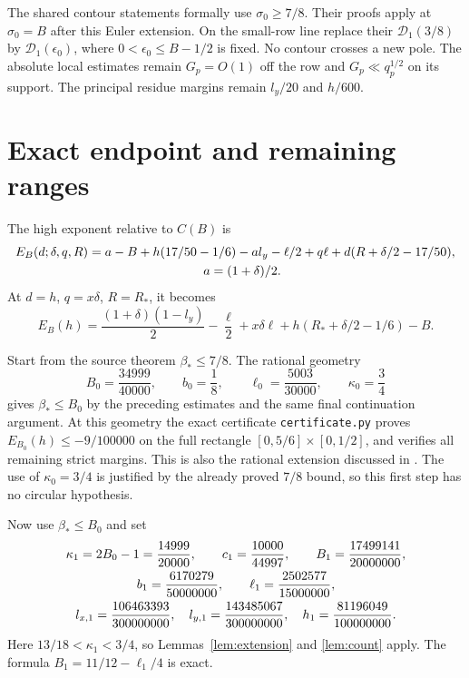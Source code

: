 \documentclass[11pt]{article}
\newcommand{\Bstar}{\beta_*}
\begin{document}
The shared contour statements formally use $\sigma_0\ge7/8$.
Their proofs apply at $\sigma_0=B$ after this Euler extension.
On the small-row line replace their $\mathcal D_1(3/8)$ by
$\mathcal D_1(\epsilon_0)$, where
$0<\epsilon_0\le B-1/2$ is fixed. No contour crosses a new pole.
The absolute local estimates remain $G_p=O(1)$ off the row and
$G_p\ll q_p^{1/2}$ on its support. The principal residue margins
remain $l_y/20$ and $h/600$.

\section{Exact endpoint and remaining ranges}

The high exponent relative to $C(B)$ is
\begin{align}\label{eq:high}
 E_B(d;\delta,q,R)
 &=a-B+h(17/50-1/6)-a l_y-\ell/2+q\ell
       +d(R+\delta/2-17/50),\\
 &\hspace{32mm}a=(1+\delta)/2.\notag
\end{align}
At $d=h$, $q=x\delta$, $R=R_*$, it becomes
\begin{equation}\label{eq:endpoint}
 E_B(h)=\frac{(1+\delta)(1-l_y)}2-\frac\ell2+x\delta\ell
       +h(R_*+\delta/2-1/6)-B.
\end{equation}

Start from the source theorem $\Bstar\le7/8$. The rational geometry
\[
 B_0=\frac{34999}{40000},\qquad b_0=\frac18,
 \qquad\ell_0=\frac{5003}{30000},\qquad\kappa_0=\frac34
\]
gives $\Bstar\le B_0$ by the preceding estimates and the same final
continuation argument. At this geometry the exact certificate
\texttt{certificate.py} proves $E_{B_0}(h)\le-9/100000$ on the full
rectangle $[0,5/6]\times[0,1/2]$, and verifies all remaining strict
margins. This is also the rational extension discussed in \cite{liu}.
The use of $\kappa_0=3/4$ is justified by the already proved $7/8$
bound, so this first step has no circular hypothesis.

Now use $\Bstar\le B_0$ and set
\begin{gather}\label{eq:stage1}
 \kappa_1=2B_0-1=\frac{14999}{20000},\qquad
 c_1=\frac{10000}{44997},\qquad
 B_1=\frac{17499141}{20000000},\\
 b_1=\frac{6170279}{50000000},\qquad
 \ell_1=\frac{2502577}{15000000},\notag\\
 l_{x,1}=\frac{106463393}{300000000},\quad
 l_{y,1}=\frac{143485067}{300000000},\quad
 h_1=\frac{81196049}{100000000}.\notag
\end{gather}
Here $13/18<\kappa_1<3/4$, so Lemmas~\ref{lem:extension} and
\ref{lem:count} apply. The formula $B_1=11/12-\ell_1/4$ is exact.
\end{document}
